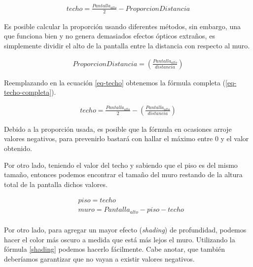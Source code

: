 \begin{equation}
\begin{aligned}
\label{eq-techo}
techo = \frac{Pantalla_{alto}}{2} - ProporcionDistancia
\end{aligned}
\end{equation}

Es posible calcular la proporción usando diferentes métodos, sin embargo, una que funciona bien y no genera demasiados efectos ópticos extraños, es simplemente dividir el alto de la pantalla entre la distancia con respecto al muro. 

\begin{equation}
\begin{aligned}
\label{eq-propdist}
ProporcionDistancia = \left(\frac{Pantalla_{alto}}{distancia}\right)
\end{aligned}
\end{equation}

Reemplazando en la ecuación \ref{eq-techo} obtenemos la fórmula completa (\ref{eq-techo-completa}).

\begin{equation}
\begin{aligned}
\label{eq-techo-completa}
techo = \frac{Pantalla_{alto}}{2} - \left(\frac{Pantalla_{alto}}{distancia}\right)
\end{aligned}
\end{equation}


Debido a la proporción usada, es posible que la fórmula en ocasiones arroje valores negativos, para prevenirlo bastará con hallar el máximo entre 0 y el valor obtenido.

Por otro lado, teniendo el valor del techo y sabiendo que el piso es del mismo tamaño, entonces podemos encontrar el tamaño del muro restando de la altura total de la pantalla dichos valores.

\begin{equation}
\begin{aligned}
\label{eq-muros}
& piso = techo \\
& muro = Pantalla_{alto} - piso - techo \\
\end{aligned}
\end{equation}


Por otro lado, para agregar un mayor efecto (\emph{shading}) de profundidad, podemos hacer el color más oscuro a medida que está más lejos el muro. Utilizando la fórmula \ref{shading} podemos hacerlo fácilmente. Cabe anotar, que también deberíamos garantizar que no vayan a existir valores negativos.

